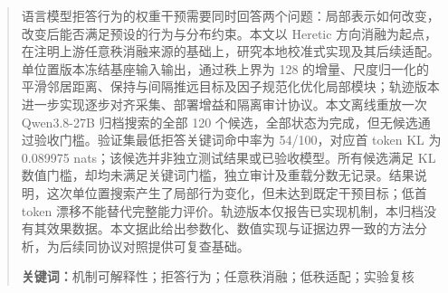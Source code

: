 \begin{abstract}
\label{sec:abstract}
语言模型拒答行为的权重干预需要同时回答两个问题：局部表示如何改变，改变后能否满足预设的行为与分布约束。本文以 Heretic 方向消融为起点，在注明上游任意秩消融来源的基础上，研究本地校准式实现及其后续适配。单位置版本冻结基座输入输出，通过秩上界为 128 的增量、尺度归一化的平滑邻居距离、保持与间隔推远目标及因子规范化优化局部模块；轨迹版本进一步实现逐步对齐采集、部署增益和隔离审计协议。本文离线重放一次 Qwen3.8-27B 归档搜索的全部 120 个候选，全部状态为完成，但无候选通过验收门槛。验证集最低拒答关键词命中率为 54/100，对应首 token KL 为 0.089975 nats；该候选并非独立测试结果或已验收模型。所有候选满足 KL 数值门槛，却均未满足关键词门槛，独立审计及重载分数无记录。结果说明，这次单位置搜索产生了局部行为变化，但未达到既定干预目标；低首 token 漂移不能替代完整能力评价。轨迹版本仅报告已实现机制，本归档没有其效果数据。本文据此给出参数化、数值实现与证据边界一致的方法分析，为后续同协议对照提供可复查基础。

\noindent\textbf{关键词：}机制可解释性；拒答行为；任意秩消融；低秩适配；实验复核
\end{abstract}
